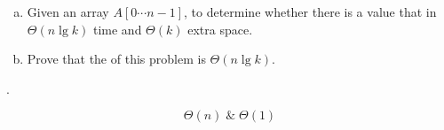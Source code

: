 
\begin{frame}{}

  \pause
  \begin{columns}
  \end{columns}
\end{frame}

\begin{frame}{}
  \begin{exampleblock}{}
    \begin{enumerate}[(a)]
      \item Given an array $A[0 \cdots n-1]$, to determine whether there is a value that 
	in $\Theta(n \lg k)$ time and $\Theta(k)$ extra space.
      \item Prove that the  of this problem is $\Theta(n \lg k)$.
    \end{enumerate}
  \end{exampleblock}

  \pause
  \vspace{0.50cm}
  \begin{exampleblock}{}
    \centerline{.}
    \[
      \Theta(n) \;\&\; \Theta(1)
    \]
  \end{exampleblock}
\end{frame}
